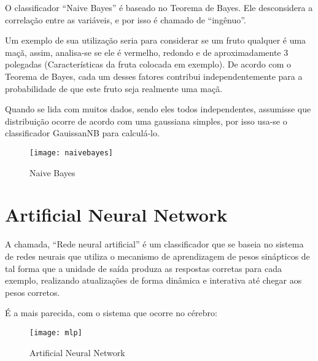 O classificador “Naive Bayes” é baseado no Teorema de Bayes. Ele desconsidera a correlação entre as variáveis, e por isso é chamado de “ingênuo”. 

Um exemplo de sua utilização seria para considerar se um fruto qualquer é uma maçã, assim, analisa-se se ele é vermelho, redondo e de aproximadamente 3 polegadas (Características da fruta colocada em exemplo). De acordo com o Teorema de Bayes, cada um desses fatores contribui independentemente para a probabilidade de que este fruto seja realmente uma maçã.

Quando se lida com muitos dados, sendo eles todos independentes, assumisse que distribuição ocorre de acordo com uma gaussiana simples, por isso usa-se o classificador GauissanNB para calculá-lo.


\begin{figure}[!htb]
\begin{center}
\caption{Naive Bayes}
\texttt{[image: naivebayes]}
\end{center}
\cite{NAIVEBAYES}
\end{figure}


\section{\textbf{Artificial Neural Network}}

A chamada, “Rede neural artificial” é um classificador que se baseia no sistema de redes neurais que utiliza o mecanismo de aprendizagem de pesos sinápticos de tal forma que a unidade de saída produza as respostas corretas para cada exemplo, realizando atualizações de forma dinâmica e interativa até chegar aos pesos corretos.

É a mais parecida, com o sistema que ocorre no cérebro:


\begin{figure}[!htb]
\begin{center}
\caption{Artificial Neural Network}
\texttt{[image: mlp]}
\end{center}
\cite{MLP}
\end{figure}


